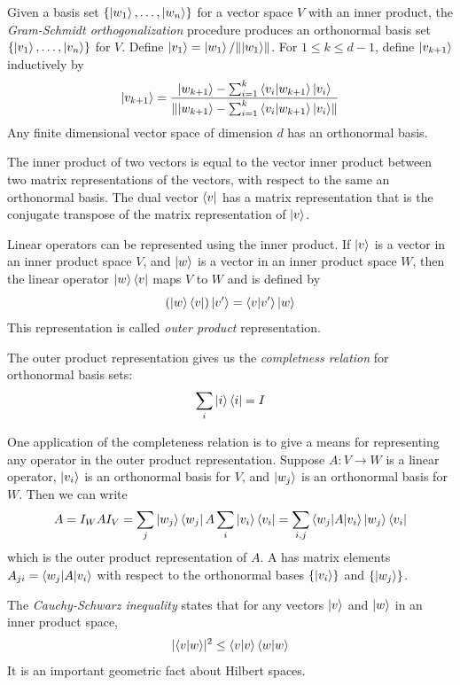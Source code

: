 Given a basis set $\{\ket{w_1}, \ldots, \ket{w_n}\}$ for a vector space $V$ with an inner product,
the \emph{Gram-Schmidt orthogonalization} procedure produces an orthonormal basis set $\{\ket{v_1}, \ldots, \ket{v_n}\}$ for $V$.
Define $\ket{v_1} = \ket{w_1}/\lVert\ket{w_1}\rVert$.
For $1\leq k \leq d-1$, define $\ket{v_{k+1}}$ inductively by
\[
    \ket{v_{k+1}} = \frac{\ket{w_{k+1}} - \sum_{i=1}^k \braket{v_i|w_{k+1}}\ket{v_i}}{\lVert\ket{w_{k+1}} - \sum_{i=1}^k \braket{v_i|w_{k+1}}\ket{v_i}\rVert}
\]
Any finite dimensional vector space of dimension $d$ has an orthonormal basis.

The inner product of two vectors is equal to the vector inner product between two matrix representations of the vectors,
with respect to the same an orthonormal basis. 
The dual vector $\bra{v}$ has a matrix representation that is the conjugate transpose of the matrix representation of $\ket{v}$.

Linear operators can be represented using the inner product.
If $\ket{v}$ is a vector in an inner product space $V$,
and $\ket{w}$ is a vector in an inner product space $W$,
then the linear operator $\ket{w}\bra{v}$ maps $V$ to $W$ and is defined by
\[
    (\ket{w}\bra{v})\ket{v'} = \braket{v|v'}\ket{w}
\]
This representation is called \emph{outer product} representation.

The outer product representation gives us the \emph{completness relation} for orthonormal basis sets:
\[
    \sum_i \ket{i}\bra{i} = I
\]

One application of the completeness relation is to give a means for representing any operator in the outer product representation.
Suppose $A\colon V \to W$ is a linear operator,
$\ket{v_i}$ is an orthonormal basis for $V$, and $\ket{w_j}$ is an orthonormal basis for $W$.
Then we can write
\[
    A = I_W A I_V = \sum_{j} \ket{w_j}\bra{w_j} A \sum_i \ket{v_i}\bra{v_i} = \sum_{i,j} \braket{w_j|A|v_i}\ket{w_j}\bra{v_i} 
\]
which is the outer product representation of $A$.
A has matrix elements $A_{ji} = \braket{w_j|A|v_i}$ with respect to the orthonormal bases $\{\ket{v_i}\}$ and $\{\ket{w_j}\}$.

The \emph{Cauchy-Schwarz inequality} states that for any vectors $\ket{v}$ and $\ket{w}$ in an inner product space,
\[
    \lvert\braket{v|w}\rvert^2 \leq \braket{v|v}\braket{w|w}
\]
It is an important geometric fact about Hilbert spaces.

